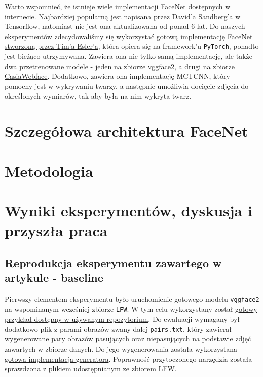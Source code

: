 \documentclass[11pt]{article}
\begin{document}
    Warto wspomnieć, że istnieje wiele implementacji FaceNet dostępnych w internecie. Najbardziej popularną jest \href{https://github.com/davidsandberg/facenet}{napisana przez David'a Sandberg'a}
    w Tensorflow, natomiast nie jest ona aktualizowana od ponad 6 lat. Do naszych eksperymentów zdecydowaliśmy się wykorzystać \href{https://github.com/timesler/facenet-pytorch}{gotową implementację FaceNet stworzoną przez Tim'a Esler'a},
    która opiera się na framework'u \texttt{PyTorch}, ponadto jest bieżąco utrzymywana.
    Zawiera ona nie tylko samą implementację, ale także dwa przetrenowane modele - jeden na zbiorze \href{https://paperswithcode.com/dataset/vggface2-1}{vggface2}, 
    a drugi na zbiorze \href{https://www.kaggle.com/datasets/debarghamitraroy/casia-webface}{CasiaWebface}. Dodatkowo, zawiera ona implementację MCTCNN, który pomocny jest w wykrywaniu
    twarzy, a następnie umożliwia docięcie zdjęcia do określonych wymiarów, tak aby była na nim wykryta twarz.

    \section{Szczegółowa architektura FaceNet}

    \section{Metodologia}


    \section{Wyniki eksperymentów, dyskusja i przyszła praca}

    \subsection{Reprodukcja eksperymentu zawartego w artykule - baseline}
    Pierwszy elementem eksperymentu było uruchomienie gotowego modelu \texttt{vggface2} na wspominanym wcześniej zbiorze \texttt{LFW}.
    W tym celu wykorzystany został \href{https://github.com/timesler/facenet-pytorch/blob/master/examples/lfw_evaluate.ipynb}{gotowy przykład dostępny w używanym repozytorium}.
    Do ewaluacji wymagany był dodatkowo plik z parami obrazów zwany dalej \texttt{pairs.txt}, który zawierał wygenerowane pary obrazów pasujących oraz niepasujących na podstawie zdjęć zawartych
    w zbiorze danych. Do jego wygenerowania została wykorzystana \href{https://github.com/VictorZhang2014/facenet/blob/master/mydata/generate_pairs.py}{gotowa implementacja generatora}.
    Poprawność przytoczonego narzędzia została sprawdzona z \href{vis-www.cs.umass.edu/lfw/pairs.txt}{plikiem udostępnianym ze zbiorem LFW}.
\end{document}
